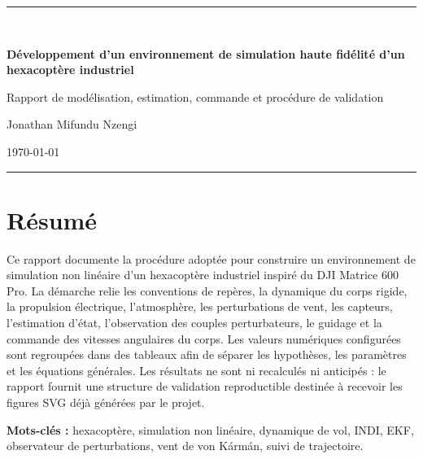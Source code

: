 \documentclass[11pt,a4paper,oneside]{report}
\begin{document}
	
	\begin{titlepage}
		\centering
		\vspace*{1.5cm}
		{\color{TitleBlue}\rule{0.82\textwidth}{1.2pt}}\\[1.2cm]
		{\Huge\bfseries\color{TitleBlue} Développement d'un environnement de simulation haute fidélité d'un hexacoptère industriel\par}
		\vspace{0.9cm}
		{\Large Rapport de modélisation, estimation, commande et procédure de validation\par}
		\vspace{1.4cm}
		\vfill
		{\large Jonathan Mifundu Nzengi\par}
		\vspace{0.35cm}
		{\large \today\par}
		\vspace{0.9cm}
		{\color{TitleBlue}\rule{0.82\textwidth}{1.2pt}}
		
	\end{titlepage}
	
	
	\chapter*{Résumé}
	Ce rapport documente la procédure adoptée pour construire un environnement de simulation non linéaire d'un hexacoptère industriel inspiré du DJI Matrice 600 Pro. La démarche relie les conventions de repères, la dynamique du corps rigide, la propulsion électrique, l'atmosphère, les perturbations de vent, les capteurs, l'estimation d'état, l'observation des couples perturbateurs, le guidage et la commande des vitesses angulaires du corps. Les valeurs numériques configurées sont regroupées dans des tableaux afin de séparer les hypothèses, les paramètres et les équations générales. Les résultats ne sont ni recalculés ni anticipés : le rapport fournit une structure de validation reproductible destinée à recevoir les figures SVG déjà générées par le projet.
	
	\textbf{Mots-clés :} hexacoptère, simulation non linéaire, dynamique de vol, INDI, EKF, observateur de perturbations, vent de von Kármán, suivi de trajectoire.
	
\end{document}
